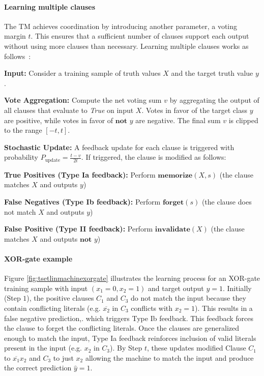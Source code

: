 \paragraph{Learning multiple clauses}
The TM achieves coordination by introducing another parameter, a voting margin $t$. This ensures that a sufficient number of clauses support each output without using more clauses than necessary. Learning multiple clauses works as follows~\cite{glimsdal2021coalescedmultioutputtsetlinmachines}:
\begin{compactenum}
    \item \textbf{Input:} Consider a training sample of truth values $X$ and the target truth value $y$.
    \item \textbf{Vote Aggregation:} Compute the net voting sum $v$ by aggregating the output of all clauses that evaluate to \textit{True} on input $X$. Votes in favor of the target class $y$ are positive, while votes in favor of $\textbf{not } y$ are negative. The final sum $v$ is clipped to the range $[-t, t]$.
    \item \textbf{Stochastic Update:} A feedback update for each clause is triggered with probability $P_\text{update} = \frac{t-v}{2t}$. If triggered, the clause is modified as follows:
    \begin{compactenum}
        \item \textbf{True Positives (Type Ia feedback):} Perform $\textbf{memorize}(X,s)$ (the clause matches $X$ and outputs $y$)
        \item \textbf{False Negatives (Type Ib feedback):} Perform $\textbf{forget}(s)$ (the clause does not match $X$ and outputs $y$)
        \item \textbf{False Positive (Type II feedback):} Perform $\textbf{invalidate}(X)$ (the clause matches $X$ and outputs $\textbf{not } y$)
    \end{compactenum}
\end{compactenum}

\paragraph{XOR-gate example}
Figure \ref{fig:tsetlinmachinexorgate} illustrates the learning process for an XOR-gate training sample with input $(x_1=0,x_2=1)$ and target output $y=1$. Initially (Step $1$), the positive clauses $C_1$ and $C_3$ do not match the input because they contain conflicting literals (e.g. $\overline{x_2}$ in $C_3$ conflicts with $x_2=1$). This results in a false negative prediction,. which triggers Type Ib feedback. This feedback forces the clause to forget the conflicting literals. Once the clauses are generalized enough to match the input, Type Ia feedback reinforces inclusion of valid literals present in the input (e.g. $x_2$ in $C_3$). By Step $t$, these updates modified Clause $C_1$ to $\overline{x_1}x_2$ and $C_3$ to just $x_2$ allowing the machine to match the input and produce the correct prediction $\hat{y}=1$.

